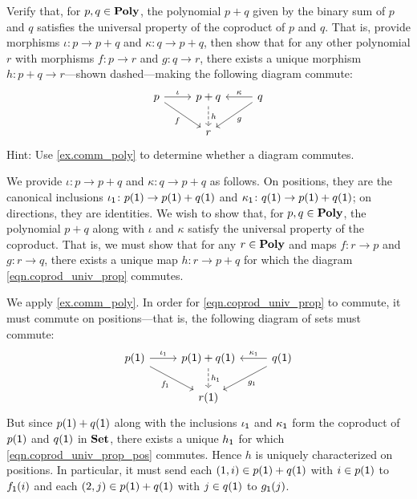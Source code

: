 \documentclass[Book-Poly]{subfiles}
\begin{document}
\begin{exercise}
Verify that, for $p, q \in \mathbf{Poly}$, the polynomial $p+q$ given by the binary sum of $p$ and $q$ satisfies the universal property of the coproduct of $p$ and $q$.
That is, provide morphisms $\iota \colon p \to p + q$ and $\kappa \colon q \to p + q$, then show that for any other polynomial $r$ with morphisms $f \colon p \to r$ and $g \colon q \to r$, there exists a unique morphism $h \colon p+q \to r$---shown dashed---making the following diagram commute:
\begin{equation} \label{eqn.coprod_univ_prop}
\begin{tikzcd}
	p \ar[r, "\iota"] \ar[dr, "f"'] &
	p + q \ar[d, "h", dashed] &
	q \ar[l, "\kappa"'] \ar[dl, "g"] \\
	& r
\end{tikzcd}
\end{equation}
Hint: Use \cref{ex.comm_poly} to determine whether a diagram commutes.
\begin{solution}
We provide $\iota \colon p \to p + q$ and $\kappa \colon q \to p + q$ as follows.
On positions, they are the canonical inclusions $\iota_{\textsf{1}} \colon p(\textsf{1}) \to p(\textsf{1})+q(\textsf{1})$ and $\kappa_{\textsf{1}} \colon q(\textsf{1}) \to p(\textsf{1})+q(\textsf{1})$; on directions, they are identities.
We wish to show that, for $p, q \in \mathbf{Poly}$, the polynomial $p+q$ along with $\iota$ and $\kappa$ satisfy the universal property of the coproduct.
That is, we must show that for any $r \in \mathbf{Poly}$ and maps $f \colon r \to p$ and $g \colon r \to q$, there exists a unique map $h \colon r \to p+q$ for which the diagram \eqref{eqn.coprod_univ_prop} commutes.

We apply \cref{ex.comm_poly}.
In order for \eqref{eqn.coprod_univ_prop} to commute, it must commute on positions---that is, the following diagram of sets must commute:
\begin{equation} \label{eqn.coprod_univ_prop_pos}
\begin{tikzcd}
	p(\1) \ar[r, "\iota_\1"] \ar[dr, "f_\1"'] &
	p(\1) + q(\1) \ar[d, "h_\1", dashed] &
	q(\1) \ar[l, "\kappa_\1"'] \ar[dl, "g_\1"] \\
	& r(\1)
\end{tikzcd}
\end{equation}
But since $p(1)+q(\textsf{1})$ along with the inclusions $\iota_{\textsf{1}}$ and $\kappa_{\textsf{1}}$ form the coproduct of $p(\textsf{1})$ and $q(\textsf{1})$ in $\mathbf{Set}$, there exists a unique $h_{\textsf{1}}$ for which \eqref{eqn.coprod_univ_prop_pos} commutes.
Hence $h$ is uniquely characterized on positions.
In particular, it must send each $(1,i) \in p(\textsf{1})+q(\textsf{1})$ with $i \in p(\textsf{1})$ to $f_{\textsf{1}}(i)$ and each $(2,j) \in p(\textsf{1})+q(\textsf{1})$ with $j \in q(\textsf{1})$ to $g_{\textsf{1}}(j)$.


\end{solution}
\end{exercise}
\end{document}
